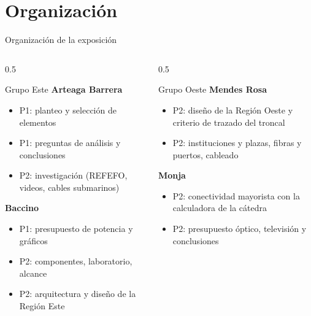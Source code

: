 \section[Organización]{Organización}
\begin{frame}{Organización de la exposición}
  \begin{columns}[T]
    \begin{column}{0.5\textwidth}
      \begin{block}{Grupo Este}
        \small
        \textbf{Arteaga Barrera}
        \begin{itemize}
          \item P1: planteo y selección de elementos
          \item P1: preguntas de análisis y conclusiones
          \item P2: investigación (REFEFO, videos, cables submarinos)
        \end{itemize}
        \textbf{Baccino}
        \begin{itemize}
          \item P1: presupuesto de potencia y gráficos
          \item P2: componentes, laboratorio, alcance
          \item P2: arquitectura y diseño de la Región Este
        \end{itemize}
      \end{block}
    \end{column}
    \begin{column}{0.5\textwidth}
      \begin{block}{Grupo Oeste}
        \small
        \textbf{Mendes Rosa}
        \begin{itemize}
          \item P2: diseño de la Región Oeste y criterio de trazado del troncal
          \item P2: instituciones y plazas, fibras y puertos, cableado
        \end{itemize}
        \textbf{Monja}
        \begin{itemize}
          \item P2: conectividad mayorista con la calculadora de la cátedra
          \item P2: presupuesto óptico, televisión y conclusiones
        \end{itemize}
      \end{block}

\end{column}
\end{columns}
\end{frame}
